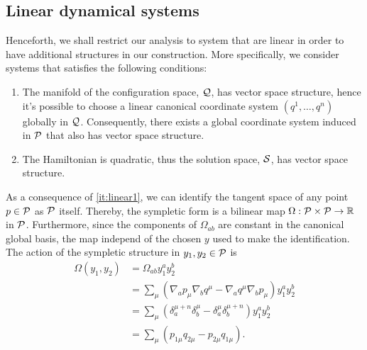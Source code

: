\subsection*{Linear dynamical systems}
Henceforth, we shall restrict our analysis to system that are linear in order to have additional structures in our construction. More specifically, we consider systems that satisfies the following conditions:
\begin{enumerate}
    \item\label{it:linear1} The manifold of the configuration space, \({\mathcal{Q}}\), has vector space structure, hence it's possible to choose a linear canonical coordinate system \((q^1,\dots,q^n)\) globally in \({\mathcal{Q}}\). Consequently, there exists a global coordinate system induced in \({\mathcal{P}}\) that also has vector space structure.
    \item\label{it:linear2} The Hamiltonian is quadratic, thus the solution space, \({\mathcal{S}}\), has vector space structure.
\end{enumerate}

As a consequence of \cref{it:linear1}, we can identify the tangent space of any point \(p\in{\mathcal{P}}\) as \({\mathcal{P}}\) itself. Thereby, the sympletic form is a bilinear map \(\Omega:{\mathcal{P}}\times{\mathcal{P}}\to{\mathbb{R}}\) in \({\mathcal{P}}\). Furthermore, since the components of \(\Omega_{ab}\) are constant in the canonical global basis, the map independ of the chosen \(y\) used to make the identification. The action of the sympletic structure in \(y_1,y_2\in{\mathcal{P}}\) is
\begin{subequations}
    \begin{align}
        \Omega(y_1,y_2)&=\Omega_{ab}y_1^ay_2^b\\
        &=\sum_\mu\left(\nabla_ap_\mu\nabla_bq^\mu-\nabla_aq^\mu\nabla_bp_\mu\right)y_1^ay_2^b\\
        &=\sum_\mu\left(\delta_a^{\mu+n}\delta_b^\mu-\delta_a^\mu\delta_b^{\mu+n}\right)y_1^ay_2^b\\
        &=\sum_{\mu}\left(p_{1\mu}q_{2\mu}-p_{2\mu}q_{1\mu}\right).
    \end{align}
\end{subequations}

